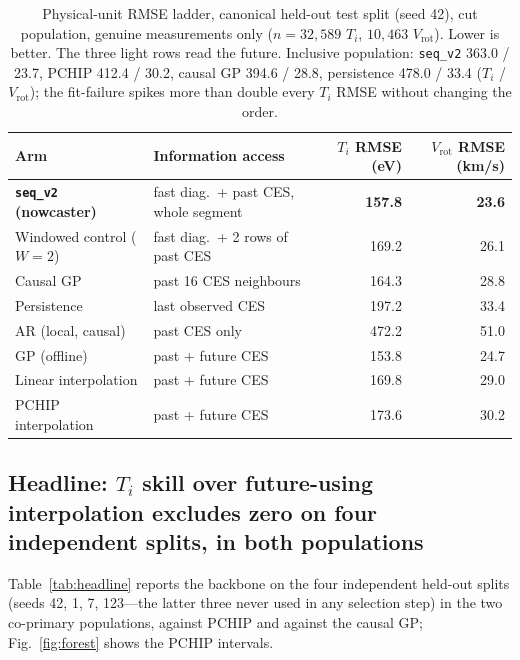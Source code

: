 \documentclass[10pt]{article}
\newcommand{\Ti}{\ensuremath{T_i}}
\newcommand{\Vrot}{\ensuremath{V_\mathrm{rot}}}
\newcommand{\seqv}{\texttt{seq\_v2}}
\begin{document}
\begin{table}[t]
  \centering
  \caption{Physical-unit RMSE ladder, canonical held-out test split (seed 42),
  cut population, genuine measurements only ($n = 32{,}589$ \Ti{}, $10{,}463$
  \Vrot{}). Lower is better. The three light rows read the future. Inclusive
  population: \seqv{} 363.0 / 23.7, PCHIP 412.4 / 30.2, causal GP 394.6 / 28.8,
  persistence 478.0 / 33.4 (\Ti{} / \Vrot); the fit-failure spikes more than
  double every \Ti{} RMSE without changing the order.}
  \label{tab:ladder}
  \small
  \begin{tabular}{llrr}
    \toprule
    Arm & Information access & \Ti{} RMSE (eV) & \Vrot{} RMSE (km/s) \\
    \midrule
    \textbf{\seqv{} (nowcaster)} & fast diag.\ + past CES, whole segment & \textbf{157.8} & \textbf{23.6} \\
    Windowed control ($W{=}2$) & fast diag.\ + 2 rows of past CES & 169.2 & 26.1 \\
    Causal GP & past 16 CES neighbours & 164.3 & 28.8 \\
    Persistence & last observed CES & 197.2 & 33.4 \\
    AR (local, causal) & past CES only & 472.2 & 51.0 \\
    \midrule
    GP (offline) & past + future CES & 153.8 & 24.7 \\
    Linear interpolation & past + future CES & 169.8 & 29.0 \\
    PCHIP interpolation & past + future CES & 173.6 & 30.2 \\
    \bottomrule
  \end{tabular}
\end{table}

\subsection{Headline: \Ti{} skill over future-using interpolation excludes zero on
four independent splits, in both populations}
\label{sec:headline}
Table~\ref{tab:headline} reports the backbone on the four independent held-out
splits (seeds 42, 1, 7, 123---the latter three never used in any selection step)
in the two co-primary populations, against PCHIP and against the causal GP;
Fig.~\ref{fig:forest} shows the PCHIP intervals.
\end{document}
